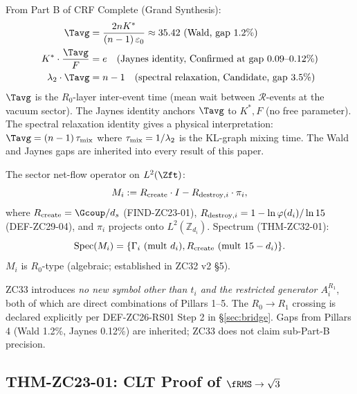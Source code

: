 \documentclass[12pt, a4paper]{article}
\begin{document}
\begin{formalbox}[title={Pillar 4: Part B vacuum clock $\Tavg$
  with Jaynes anchor}]
From Part B of CRF Complete (Grand Synthesis):
\begin{align*}
  \Tavg &= \frac{2nK^*}{(n-1)\,\varepsilon_0}
    \approx 35.42\ \text{(Wald, gap 1.2\%)}\\
  K^*\cdot\frac{\Tavg}{F} &= e
    \quad\text{(Jaynes identity, Confirmed at gap 0.09--0.12\%)}\\
  \lambda_2 \cdot \Tavg &= n - 1
    \quad\text{(spectral relaxation, Candidate, gap 3.5\%)}
\end{align*}
$\Tavg$ is the $R_0$-layer inter-event time (mean wait between
$\mathcal{R}$-events at the vacuum sector). The Jaynes identity
anchors $\Tavg$ to $K^*, F$ (no free parameter). The spectral
relaxation identity gives a physical interpretation:
$\Tavg = (n-1)\,\tau_{\rm mix}$ where $\tau_{\rm mix} = 1/\lambda_2$
is the KL-graph mixing time. The Wald and Jaynes gaps are
inherited into every result of this paper.
\end{formalbox}

\begin{formalbox}[title={Pillar 5: ZC32 v2 operator $M_i$
  (DEF-ZC32-01, THM-ZC32-01)}]
The sector net-flow operator on $L^2(\Zft)$:
\[
  M_i := R_{\rm create}\cdot I
       - R_{{\rm destroy},i}\cdot \pi_i,
\]
where $R_{\rm create} = \Gcoup/d_s$ (FIND-ZC23-01),
$R_{{\rm destroy},i} = 1 - \ln\varphi(d_i)/\ln 15$
(DEF-ZC29-04), and $\pi_i$ projects onto $L^2(\mathbb{Z}_{d_i})$.
Spectrum (THM-ZC32-01):
\[
  \mathrm{Spec}(M_i) = \{\Gamma_i\ (\text{mult } d_i),
    R_{\rm create}\ (\text{mult } 15-d_i)\}.
\]
$M_i$ is $R_0$-type (algebraic; established in ZC32 v2 §5).
\end{formalbox}

\begin{keybox}[title={Scope discipline}]
ZC33 introduces \emph{no new symbol other than $t_i$ and the
restricted generator $A_i^{R_1}$}, both of which are direct
combinations of Pillars 1--5. The $R_0\to R_1$ crossing is
declared explicitly per DEF-ZC26-RS01 Step 2 in
§\ref{sec:bridge}. Gaps from Pillars 4 (Wald 1.2\%, Jaynes
0.12\%) are inherited; ZC33 does not claim sub-Part-B precision.
\end{keybox}

\subsection{THM-ZC23-01: CLT Proof of $\fRMS \to \sqrt{3}$}
\label{sec:thm-zc23-01}
\end{document}
